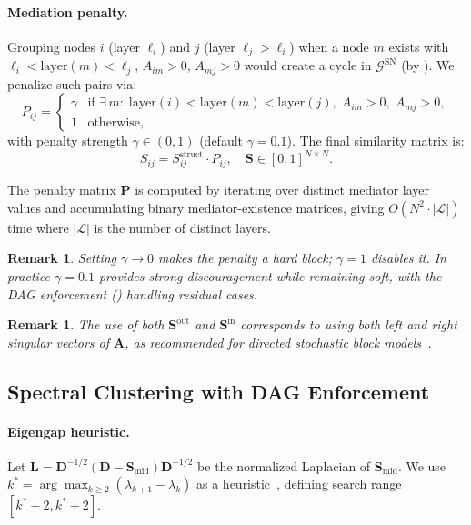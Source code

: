 \documentclass[11pt]{article}
\newtheorem{remark}[theorem]{Remark}
\newcommand{\cG}{\mathcal{G}}
\newcommand{\bA}{\mathbf{A}}
\newcommand{\bD}{\mathbf{D}}
\newcommand{\bL}{\mathbf{L}}
\newcommand{\bP}{\mathbf{P}}
\newcommand{\bS}{\mathbf{S}}
\newcommand{\1}{\mathbbm{1}}
\begin{document}
\paragraph{Mediation penalty.}
Grouping nodes $i$ (layer $\ell_i$) and $j$ (layer $\ell_j > \ell_i$) when a node $m$ exists with $\ell_i < \mathrm{layer}(m) < \ell_j$, $A_{im} > 0$, $A_{mj} > 0$ would create a cycle in $\cG^{\mathrm{SN}}$ (by ).
We penalize such pairs via:
\begin{equation}
  P_{ij} = \begin{cases}
    \gamma & \text{if } \exists\, m :\; \mathrm{layer}(i) < \mathrm{layer}(m) < \mathrm{layer}(j),\; A_{im} > 0,\; A_{mj} > 0, \\
    1      & \text{otherwise,}
  \end{cases}
  \label{eq:mediation-penalty}
\end{equation}
with penalty strength $\gamma \in (0, 1)$ (default $\gamma = 0.1$). The final similarity matrix is:
\begin{equation}
  S_{ij} = S^{\mathrm{struct}}_{ij} \cdot P_{ij}, \quad \bS \in [0,1]^{N \times N}.
  \label{eq:similarity}
\end{equation}

The penalty matrix $\bP$ is computed by iterating over distinct mediator layer values and accumulating binary mediator-existence matrices, giving $O(N^2 \cdot |\mathcal{L}|)$ time where $|\mathcal{L}|$ is the number of distinct layers.

\begin{remark}
  Setting $\gamma \to 0$ makes the penalty a hard block; $\gamma = 1$ disables it.
  In practice $\gamma = 0.1$ provides strong discouragement while remaining soft, with the DAG enforcement () handling residual cases.
\end{remark}

\begin{remark}
  The use of both $\bS^{\mathrm{out}}$ and $\bS^{\mathrm{in}}$ corresponds to using both left and right singular vectors of $\bA$, as recommended for directed stochastic block models~\citep{rohe2016co}.
\end{remark}

\subsection{Spectral Clustering with DAG Enforcement}
\label{sec:clustering}

\paragraph{Eigengap heuristic.}
Let $\bL = \bD^{-1/2}(\bD - \bS_{\mathrm{mid}})\bD^{-1/2}$ be the normalized Laplacian of $\bS_{\mathrm{mid}}$.
We use $k^* = \arg\max_{k \ge 2}(\lambda_{k+1} - \lambda_k)$ as a heuristic~\citep{von2007tutorial}, defining search range $[k^* - 2, k^* + 2]$.
\end{document}
